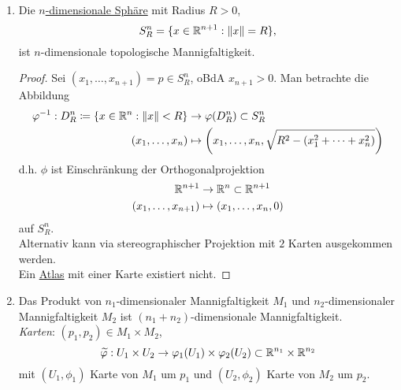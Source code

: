 \begin{example}
\begin{enumerate}
    \item Die \hyperref[bsp:einheitssphaere]{$ n $-dimensionale Sphäre} mit Radius $ R > 0 $,
    \begin{equation*}
      S^n_R = \{ x \in \mathbb{R}^{n+1} : \Vert x \Vert = R \}\text{,}
    \end{equation*}
    ist $ n $-dimensionale topologische Mannigfaltigkeit.
    \begin{proof}
      Sei $ (x_1, \dots, x_{n+1}) = p \in S^n_R $, oBdA $ x_{n+1} > 0 $. Man betrachte die Abbildung
      \begin{align*}
        \varphi^{-1} : D^n_R \coloneqq \left\{ x \in \mathbb{R}^n : \Vert x \Vert < R \right\} &\to \varphi(D^n_R) \subset S^n_R \\
          (x_1, \dots, x_n) &\mapsto \left(x_1, \dots, x_n, \sqrt{R^2-(x_1^2 + \cdots + x_n^2)}\right)
      \end{align*}
      d.h. $ \phi $ ist Einschränkung der Orthogonalprojektion
      \begin{align*}
        \mathbb{R}^{n+1} &\to \mathbb{R}^n \subset \mathbb{R}^{n+1} \\
          (x_1, \dots, x_{n+1}) &\mapsto (x_1, \dots, x_n, 0)
      \end{align*}
      auf $ S_R^n $. \\
      Alternativ kann via stereographischer Projektion mit $ 2 $ Karten ausgekommen werden. \\
      Ein \hyperref[def:atlas]{Atlas} mit einer Karte existiert nicht.
    \end{proof}
    \item Das Produkt von $ n_1 $-dimensionaler Mannigfaltigkeit $ M_1 $ und $ n_2 $-dimensionaler Mannigfaltigkeit $ M_2 $ ist $ (n_1+n_2) $-dimensionale Mannigfaltigkeit. \\
    \emph{Karten}: $ (p_1, p_2) \in M_1 \times M_2 $,
    \begin{equation*}
      \widetilde{\varphi} : U_1 \times U_2 \to \varphi_1(U_1) \times \varphi_2(U_2) \subset \mathbb{R}^{n_1} \times \mathbb{R}^{n_2}
    \end{equation*}
    mit $ (U_1, \phi_1) $ Karte von $ M_1 $ um $ p_1 $ und $ (U_2, \phi_2) $ Karte von $ M_2 $ um $ p_2 $.
  \end{enumerate}
\end{example}

